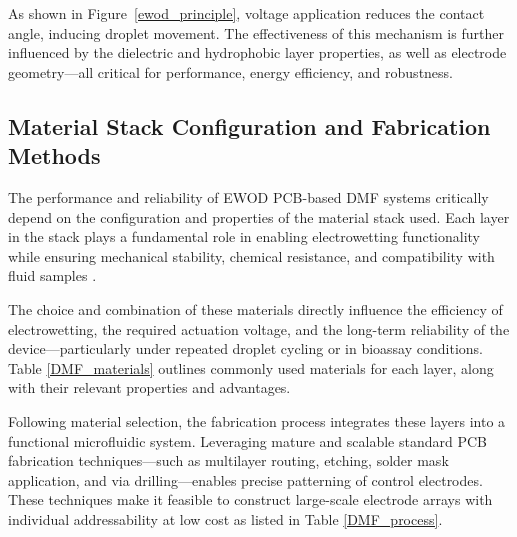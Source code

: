 \documentclass[conference,a4paper]{IEEEtran}
\begin{document}
As shown in Figure~\ref{ewod_principle}, voltage application reduces the contact angle, inducing droplet movement. The effectiveness of this mechanism is further influenced by the dielectric and hydrophobic layer properties, as well as electrode geometry—all critical for performance, energy efficiency, and robustness.

\subsection{Material Stack Configuration and Fabrication Methods}
The performance and reliability of EWOD PCB-based DMF systems critically depend on the configuration and properties of the material stack used. Each layer in the stack plays a fundamental role in enabling electrowetting functionality while ensuring mechanical stability, chemical resistance, and compatibility with fluid samples \cite{abadianHybridPaperbasedMicrofluidics2017}.

The choice and combination of these materials directly influence the efficiency of electrowetting, the required actuation voltage, and the long-term reliability of the device—particularly under repeated droplet cycling or in bioassay conditions. Table \ref{DMF_materials} outlines commonly used materials for each layer, along with their relevant properties and advantages.

Following material selection, the fabrication process integrates these layers into a functional microfluidic system. Leveraging mature and scalable standard PCB fabrication techniques—such as multilayer routing, etching, solder mask application, and via drilling—enables precise patterning of control electrodes. These techniques make it feasible to construct large-scale electrode arrays with individual addressability at low cost as listed in Table \ref{DMF_process}.
\end{document}
